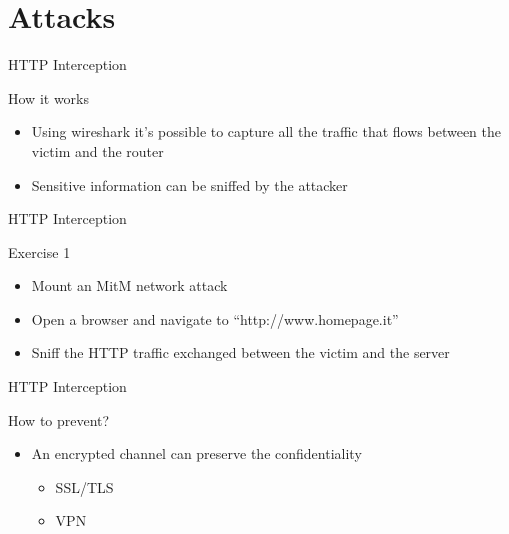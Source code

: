 \documentclass{beamer}
\begin{document}
\section{Attacks}
\begin{frame}{HTTP Interception}
  \begin{block}{How it works}
    \begin{itemize}
      \item Using wireshark it's possible to capture all the traffic that flows between the victim and the router
      \item Sensitive information can be sniffed by the attacker
    \end{itemize}
  \end{block}
\end{frame}

\begin{frame}{HTTP Interception}
  \begin{block}{Exercise 1}
    \begin{itemize}
      \item Mount an MitM network attack
      \item Open a browser and navigate to ``http://www.homepage.it''
      \item Sniff the HTTP traffic exchanged between the victim and the server
    \end{itemize}
  \end{block}
\end{frame}

\begin{frame}{HTTP Interception}
  \begin{block}{How to prevent?}
  \pause
  \begin{itemize}
    \item An encrypted channel can preserve the confidentiality
    \begin{itemize}
      \item SSL/TLS
      \item VPN
    \end{itemize}
  \end{itemize}
  \end{block}
\end{frame}
\end{document}
